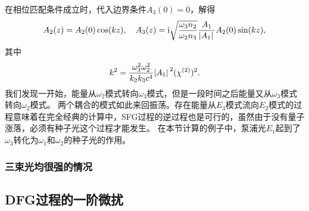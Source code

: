 在相位匹配条件成立时，代入边界条件$A_3(0) = 0$，解得
\begin{equation}
    A_2(z) = A_2(0) \cos(k z), \quad A_3(z) = \mathrm{i} \sqrt{\frac{\omega_3 n_2}{\omega_2 n_3}} \frac{A_1}{\abs*{A_1}} A_2(0) \sin(k z),
\end{equation}
其中
\begin{equation}
    k^2 = \frac{\omega_3^2 \omega_2^2}{k_2 k_3 c^4} \abs*{A_1}^2 (\chi^{(2)})^2. 
\end{equation}
我们发现一开始，能量从$\omega_2$模式转向$\omega_3$模式，但是一段时间之后能量又从$\omega_3$模式转向$\omega_2$模式。
两个耦合的模式如此来回振荡。存在能量从$E_3$模式流向$E_2$模式的过程意味着在完全经典的计算中，SFG过程的逆过程也是可行的，虽然由于没有量子涨落，必须有种子光这个过程才能发生。
在本节计算的例子中，泵浦光$E_1$起到了$\omega_3$转化为$\omega_1$和$\omega_2$的种子光的作用。

\subsubsection{三束光均很强的情况}



\subsection{DFG过程的一阶微扰}

